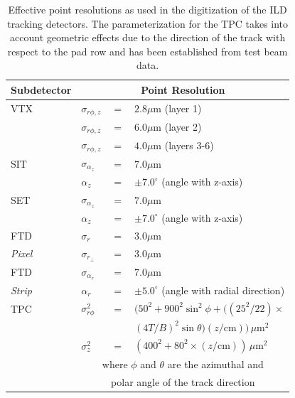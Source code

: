 \begin{table}[tbp]
\renewcommand{\arraystretch}{1.25}

\centering\small
\begin{tabular}{llcl}
\hline
 Subdetector &  \multicolumn{3}{c}{ Point Resolution }  \\
\hline
        VTX    &  $ \sigma_{r\phi,z}  $ & $=$ & $ 2.8 \mu\mathrm{m}$   (layer 1)   \\
               &  $ \sigma_{r\phi,z}  $ & $=$ & $ 6.0 \mu\mathrm{m}$   (layer 2)   \\
               &  $ \sigma_{r\phi,z}  $ & $=$ & $ 4.0 \mu\mathrm{m}$   (layers 3-6)   \\


        SIT    &  $ \sigma_{\alpha_{z}}   $ & $=$ & $ 7.0 \mu\mathrm{m}$    \\
               &  $  \alpha_{z}         $ & $=$ & $ \pm 7.0^\circ $ (angle with z-axis)        \\

        SET    &  $ \sigma_{\alpha_{z}}   $ & $=$ & $ 7.0 \mu\mathrm{m}$    \\
               &  $  \alpha_{z}         $ & $=$ & $ \pm 7.0^\circ $ (angle with z-axis)        \\

       FTD     &  $\sigma_{r}$      & $=$ & $ 3.0 \mu\mathrm{m}$    \\
  \emph{Pixel} &  $ \sigma_{r_\perp}$  & $=$ & $ 3.0 \mu\mathrm{m}$    \\

     FTD       &  $ \sigma_{\alpha_r}   $ & $=$ & $ 7.0 \mu\mathrm{m}$    \\
  \emph{Strip} &  $ \alpha_{r}         $ & $=$ & $ \pm 5.0^\circ $ (angle with radial direction)        \\

       TPC    &  $ \sigma^2_{r\phi} $ & $=$ & $ \bigl( 50^2+900^2\sin^2\phi + \bigl( (25^2/22)\times$  \\
              &                      &     &   $(4T/B)^2\sin\theta\bigr) (z/\mathrm{cm}) \bigr)\,\mu\mathrm{m}^2$  \\
               &  $ \sigma^2_{z}    $ & $=$ & $ (400^2+80^2\times (z/\mathrm{cm})) \,\mu\mathrm{m}^2 $ \\
               &   \multicolumn{3}{c}{ where $\phi$ and $\theta$ are the azimuthal and} \\
               &   \multicolumn{3}{c}{ polar angle of the track direction } \\
\hline
\end{tabular}
\caption[Simulated ILD tracking point resolutions.]{Effective point resolutions as used in the digitization of the ILD tracking detectors.
  The parameterization for the TPC takes into account geometric effects due to the direction of the track with respect to the pad row and
  has been established from test beam data.
        \label{tab:ild_trk_res} }
\end{table}

